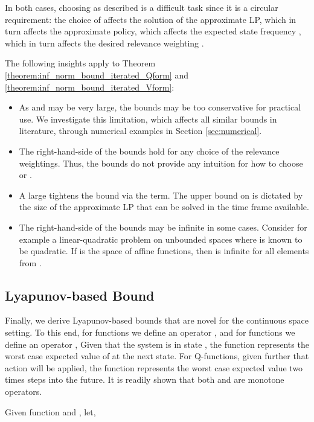 \documentclass[journal]{IEEEtran}
\newcommand{\textQ}{Q}
\begin{document}
In both cases, choosing  as described is a difficult task since it is a circular requirement: the choice of  affects the solution of the approximate LP, which in turn affects the approximate policy, which affects the expected state frequency , which in turn affects the desired relevance weighting .


The following insights apply to Theorem \ref{theorem:inf_norm_bound_iterated_Qform} and \ref{theorem:inf_norm_bound_iterated_Vform}:
\begin{itemize}
	\item As  and  may be very large, the bounds may be too conservative for practical use. We investigate this limitation, which affects all similar bounds in literature, through numerical examples in Section \ref{sec:numerical}.
	
	\item The right-hand-side of the bounds hold for any choice of the relevance weightings. Thus, the bounds do not provide any intuition for how to choose  or .
	
	\item A large  tightens the bound via the  term. The upper bound on  is dictated by the size of the approximate LP that can be solved in the time frame available.
	
	\item The right-hand-side of the bounds may be infinite in some cases. Consider for example a linear-quadratic problem on unbounded spaces where  is known to be quadratic. If  is the space of affine functions, then  is infinite for all elements from .
\end{itemize}


\subsection{Lyapunov-based Bound}  \label{sec:bounds_fitting_lyap}

Finally, we derive Lyapunov-based bounds that are novel for the continuous space setting.
To this end, for functions  we define an operator ,
and for functions  we define an operator ,
Given that the system is in state , the function  represents the worst case expected value of  at the next state. For \textQ-functions, given further that action  will be applied, the function  represents the worst case expected value two times steps into the future.
It is readily shown that both  and  are monotone operators.


Given function  and , let,
\end{document}
